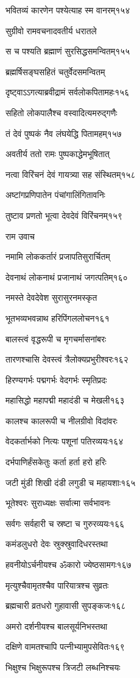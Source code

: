 भवितव्यं कारणेन पश्येत्याह स्म वानरम्१५४

सुग्रीवो रामवचनादवतीर्य धरातले

स च पश्यति ब्रह्माणं सुरसिद्धसमन्वितम्१५५

ब्रह्मर्षिसङ्घसहितं चतुर्वेदसमन्वितम्

दृष्ट्वाऽऽगत्याब्रवीद्रामं सर्वलोकपितामहः१५६

सहितो लोकपालैश्च वस्वादित्यमरुद्गणैः

तं देवं पुष्पकं नैव लंघयेद्धि पितामहम्१५७

अवतीर्य ततो रामः पुष्पकाद्धेमभूषितात्

नत्वा विरिंचनं देवं गायत्र्या सह संस्थितम्१५८

अष्टांगप्रणिपातेन पंचांगालिंगितावनिः

तुष्टाव प्रणतो भूत्वा देवदेवं विरिंचनम्१५९

राम उवाच

नमामि लोककर्तारं प्रजापतिसुरार्चितम्

देवनाथं लोकनाथं प्रजानाथं जगत्पतिम्१६०

नमस्ते देवदेवेश सुरासुरनमस्कृत

भूतभव्यभवन्नाथ हरिपिंगललोचन१६१

बालस्त्वं वृद्धरूपी च मृगचर्मासनांबरः

तारणश्चासि देवस्त्वं त्रैलोक्यप्रभुरीश्वरः१६२

हिरण्यगर्भः पद्मगर्भः वेदगर्भः स्मृतिप्रदः

महासिद्धो महापद्मी महादंडी च मेखली१६३

कालश्च कालरूपी च नीलग्रीवो विदांवरः

वेदकर्तार्भको नित्यः पशूनां पतिरव्ययः१६४

दर्भपाणिर्हंसकेतुः कर्ता हर्ता हरो हरिः

जटी मुंडी शिखी दंडी लगुडी च महायशाः१६५

भूतेश्वरः सुराध्यक्षः सर्वात्मा सर्वभावनः

सर्वगः सर्वहारी च स्रष्टा च गुरुरव्ययः१६६

कमंडलुधरो देवः स्रुक्स्रुवादिधरस्तथा

हवनीयोऽर्चनीयश्च ॐकारो ज्येष्ठसामगः१६७

मृत्युश्चैवामृतश्चैव पारियात्रश्च सुव्रतः

ब्रह्मचारी व्रतधरो गुहावासी सुपङ्कजः१६८

अमरो दर्शनीयश्च बालसूर्यनिभस्तथा

दक्षिणे वामतश्चापि पत्नीभ्यामुपसेवितः१६९

भिक्षुश्च भिक्षुरूपश्च त्रिजटी लब्धनिश्चयः

